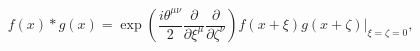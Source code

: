 \begin{equation}
  f(x) \ast g(x) = \exp \left( \frac{i \theta^{\mu \nu}}{2}
  \frac{\partial}{\partial \xi^\mu}
  \frac{\partial}{\partial \zeta^\nu} \right)
  f(x+\xi) g(x+\zeta) \Bigg|_{\xi=\zeta=0},
\end{equation}

